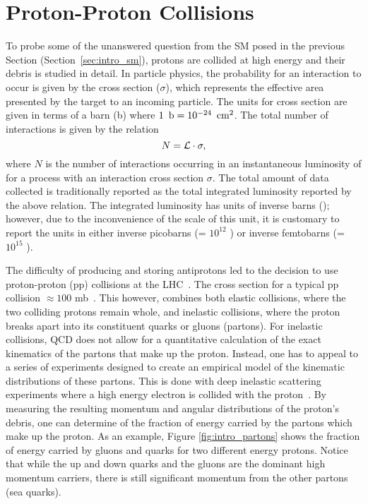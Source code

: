 \section{Proton-Proton Collisions}
\label {sec:intro_collider}
To probe some of the unanswered question from the SM posed in the previous
Section (Section~\ref{sec:intro_sm}), protons are collided at high energy and
their debris is studied in detail. In particle physics, the probability for an
interaction to occur is given by the cross section ($\sigma$), which represents
the effective area presented by the target to an incoming particle. The units
for cross section are given in terms of a barn (b) where $1\ \barn = 10^{-24}\
\rm{\cm^2}$. The total number of interactions is given by the relation
\begin{equation}
    N = \mathcal{L} \cdot \sigma,
\end{equation}
where $N$ is the number of interactions occurring in an instantaneous
luminosity of \lumi for a process with an interaction cross section $\sigma$.
The total amount of data collected is traditionally reported as the total
integrated luminosity reported by the above relation. The integrated luminosity
has units of inverse barns (\binv); however, due to the inconvenience of the
scale of this unit, it is customary to report the units in either inverse
picobarns (\pbinv = $10^{12}$ \binv) or inverse femtobarns (\fbinv = $10^{15}$
\binv).

The difficulty of producing and storing antiprotons led to the decision to use
proton-proton (pp) collisions at the LHC~\cite{lhcmachine}. The cross section
for a typical pp collision $\approx 100$ mb~\cite{qcdprimer}. This however,
combines both elastic collisions, where the two colliding protons remain whole,
and inelastic collisions, where the proton breaks apart into its constituent
quarks or gluons (partons). For inelastic collisions, QCD does not allow for
a quantitative calculation of the exact kinematics of the partons that make
up the proton. Instead, one has to appeal to a series of experiments designed
to create an empirical model of the kinematic distributions of these partons.
This is done with deep inelastic scattering experiments where a high energy
electron is collided with the proton~\cite{halzen}. By measuring the resulting
momentum and angular distributions of the proton's debris, one can determine of
the fraction of energy carried by the partons which make up the proton. As an
example, Figure \ref{fig:intro_partons} shows the fraction of energy carried by
gluons and quarks for two different energy protons. Notice that while the up
and down quarks and the gluons are the dominant high momentum carriers, there
is still significant momentum from the other partons (sea quarks).

